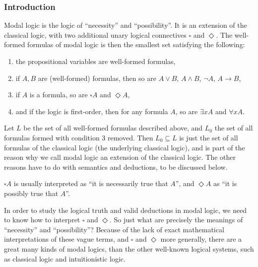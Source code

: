 \documentclass[12pt]{article}
\begin{document}
\subsubsection*{Introduction}

Modal logic is the logic of ``necessity'' and ``possibility''.  It is an extension of the classical logic, with two additional unary logical connectives $\square$ and $\Diamond$.  The well-formed formulas of modal logic is then the smallest set satisfying the following: 
\begin{enumerate}
\item the propositional variables are well-formed formulas,
\item if $A,B$ are (well-formed) formulas, then so are $A\vee B$, $A\wedge B$, $\neg A$, $A\to B$, 
\item if $A$ is a formula, so are $\square A$ and $\Diamond A$,
\item and if the logic is first-order, then for any formula $A$, so are $\exists x A$ and $\forall x A$.
\end{enumerate}
Let $L$ be the set of all well-formed formulas described above, and $L_0$ the set of all formulas formed with condition 3 removed.  Then $L_0 \subseteq L$ is just the set of all formulas of the classical logic (the underlying classical logic), and is part of the reason why we call modal logic an extension of the classical logic.  The other reasons have to do with semantics and deductions, to be discussed below.

$\square A$ is usually interpreted as ``it is necessarily true that $A$'', and $\Diamond A$ as ``it is possibly true that $A$''.

In order to study the logical truth and valid deductions in modal logic, we need to know how to interpret $\square$ and $\Diamond$.  So just what are precisely the meanings of ``necessity'' and ``possibility''?  Because of the lack of exact mathematical interpretations of these vague terms, and $\square$ and $\Diamond$ more generally, there are a great many kinds of modal logics, than the other well-known logical systems, such as classical logic and intuitionistic logic.
\end{document}
